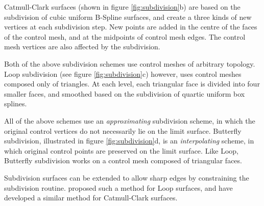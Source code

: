 Catmull-Clark surfaces (shown in figure \ref{fig:subdivision}b) are based on the subdivision of cubic uniform B-Spline surfaces, and create a three kinds of new vertices at each subdivision step. New points are added in the centre of the faces of the control mesh, and at the midpoints of control mesh edges. The control mesh vertices are also affected by the subdivision.

Both of the above subdivision schemes use control meshes of arbitrary topology. Loop subdivision (see figure \ref{fig:subdivision}c) however, uses control meshes composed only of triangles. At each level, each triangular face is divided into four smaller faces, and smoothed based on the subdivision of quartic uniform box splines.

All of the above schemes use an {\it approximating} subdivision scheme, in which the original control vertices do not necessarily lie on the limit surface. Butterfly subdivision, illustrated in figure \ref{fig:subdivision}d, is an {\it interpolating} scheme, in which original control points are preserved on the limit surface. Like Loop, Butterfly subdivision works on a control mesh composed of triangular faces.

Subdivision surfaces can be extended to allow sharp edges by constraining the subdivision routine. \citet{Hoppe94a} proposed such a method for Loop surfaces, and \citet{DeRose98} have developed a similar method for Catmull-Clark surfaces.

